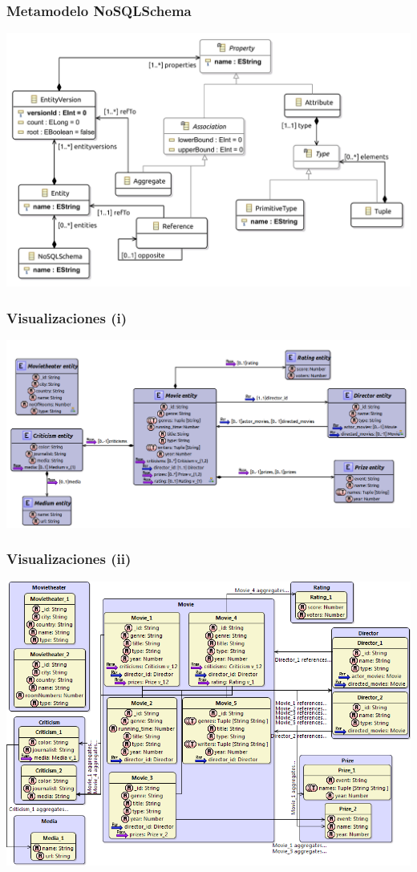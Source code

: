 \documentclass[14pt]{beamer}
\begin{document}
\begin{frame}
  \frametitle{Metamodelo NoSQLSchema}
  \includegraphics[width=\textwidth]{img/mmnosql-schema}
\end{frame}

\begin{frame}
  \frametitle{Visualizaciones (i)}
  \includegraphics[width=\textwidth]{img/siriusglobalunion}
\end{frame}

\begin{frame}
  \frametitle{Visualizaciones (ii)}
  \includegraphics[width=\textwidth]{img/siriusglobal}
\end{frame}
\end{document}
